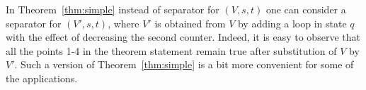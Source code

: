 \begin{remark}
In Theorem~\ref{thm:simple} instead of separator for $(V, s, t)$ one can consider a separator for $(V', s, t)$,
where $V'$ is obtained from $V$ by adding a loop in state $q$ with the effect of decreasing the second counter.
Indeed, it is easy to observe that all the points 1-4 in the theorem statement remain true after substitution of $V$ by $V'$.
Such a version of Theorem~\ref{thm:simple} is a bit more convenient for some of the applications.
\end{remark}
